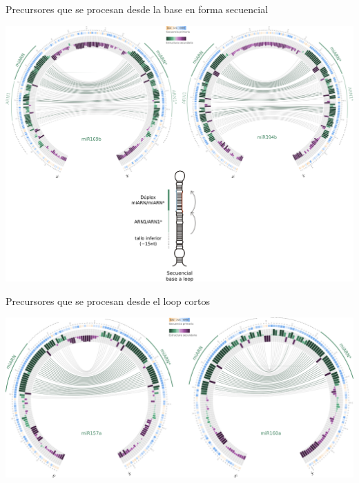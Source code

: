 \documentclass{beamer}
\begin{document}
\begin{frame}{Precursores que se procesan desde la base en forma secuencial}
	\begin{center}
		\includegraphics[width=1\textwidth]{img/seqBTL_circos.png}
	\end{center}
\end{frame}

\begin{frame}{Precursores que se procesan desde el loop cortos}
	\begin{center}
		\includegraphics[width=1\textwidth]{img/srLTB_circos.png}
	\end{center}
\end{frame}
\end{document}

